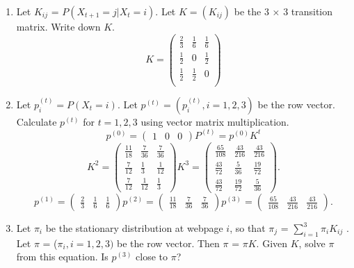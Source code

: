\documentclass{article}
\begin{document}
    \begin{enumerate}
        \item Let $K_{ij}$ = $P (X_{t+1} = j|X_t = i)$. Let $K = (K_{ij} )$ be the 3 × 3 transition matrix. Write down
    $K$.\[
    K = 
    \begin{pmatrix}
        \frac{2}{3} & \frac{1}{6} & \frac{1}{6} \\
        \frac{1}{2} & 0 & \frac{1}{2} \\
        \frac{1}{2} & \frac{1}{2} & 0 \\
    \end{pmatrix}
    \]  
    \item Let $p^{(t)}_i = P (X_t = i)$. Let $p^{(t)} = (p^{(t)}_i , i = 1, 2, 3)$ be the row vector. Calculate $p^{(t)}$ for
    $t = 1, 2, 3$ using vector matrix multiplication.
    \[
    p^{(0)} =
    \begin{pmatrix}
        1 & 0 & 0
    \end{pmatrix} 
    P^{(t)} = p^{(0)}K^t
\]\[
    K^2 =
    \begin{pmatrix}
        \frac{11}{18} & \frac{7}{36} & \frac{7}{36} \\
        \frac{7}{12} & \frac{1}{3} & \frac{1}{12} \\
        \frac{7}{12} & \frac{1}{12} & \frac{1}{3}
    \end{pmatrix}
    K^3 = 
    \begin{pmatrix}
        \frac{65}{108} & \frac{43}{216} & \frac{43}{216} \\
        \frac{43}{72} & \frac{5}{36} & \frac{19}{72} \\
        \frac{43}{72} & \frac{19}{72} & \frac{5}{36}
    \end{pmatrix}
    .\] 
    \[
    p^{(1)} =
    \begin{pmatrix}
        \frac{2}{3} & \frac{1}{6} & \frac{1}{6}
    \end{pmatrix}
    p^{(2)} =
    \begin{pmatrix}
        \frac{11}{18} & \frac{7}{36} & \frac{7}{36}
    \end{pmatrix}
    p^{(3)} =
    \begin{pmatrix}
        \frac{65}{108} & \frac{43}{216} & \frac{43}{216}
    \end{pmatrix}
    .\] 
\item Let $\pi_i$ be the stationary distribution at webpage $i$, so that $\pi_j$ = $\sum_{i=1}^3
    \pi_iK_{ij}$ . Let $\pi$ = ($\pi_i, i =
    1, 2, 3)$ be the row vector. Then $\pi$ = $\pi K$. Given $K$, solve $\pi$ from this equation. Is $p^{(3)}$ close to $\pi$?

\end{enumerate}
\end{document}
